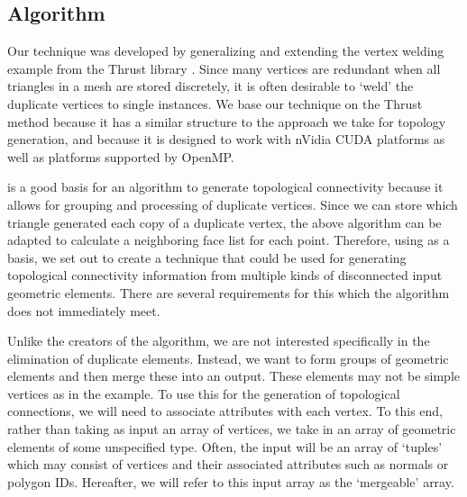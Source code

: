 \documentclass[10pt,journal,cspaper,compsoc]{IEEEtran}
\begin{document}
\subsection{Algorithm}
Our technique was developed by generalizing and extending the vertex welding example from the Thrust library \cite{Bell2012}.
Since many vertices are redundant when all triangles in a mesh are stored discretely, it is often desirable to
`weld' the duplicate vertices to single instances. We base our technique on the Thrust method because it has a similar
structure to the approach we take for topology generation, and because it is designed to work with nVidia CUDA platforms as well as platforms supported by OpenMP. 


 is a good basis for an algorithm to generate topological connectivity because it allows for
grouping and processing of duplicate vertices. Since we can store which triangle generated each copy of a duplicate vertex,
 the above algorithm can be adapted to calculate a neighboring face list for each point. Therefore, using  as a basis, we set out to create a technique that could be used for generating topological connectivity information 
from multiple kinds of disconnected input geometric elements. There are several requirements for this which the  algorithm
does not immediately meet.

Unlike the creators of the  algorithm, we are not interested specifically in the elimination of duplicate elements. Instead, we want
to form groups of geometric elements and then merge these into an output. These elements may not be simple vertices as in the  example.
To use this for the generation of topological connections, we will need to associate attributes with each vertex. To this end, rather than taking as input an array of vertices,
we take in an array of geometric elements of some unspecified type. Often, the input will be an array of `tuples' which may consist of
vertices and their associated attributes such as normals or polygon IDs. Hereafter, we will refer to this input array as the `mergeable' array.
\end{document}
